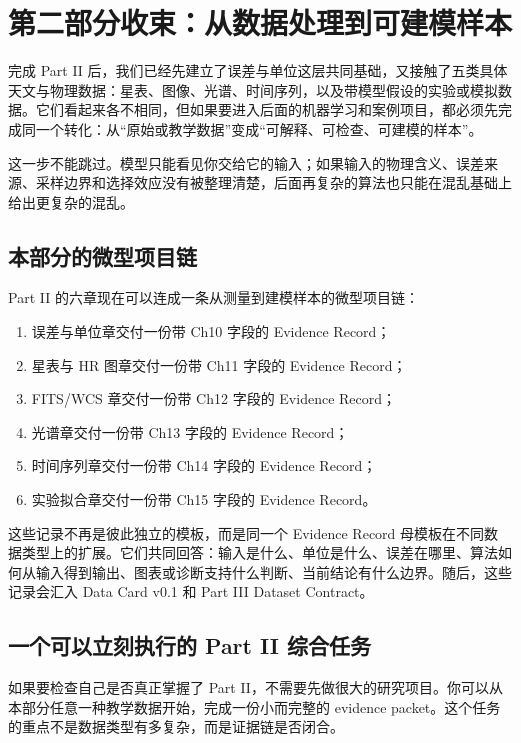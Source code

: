 \chapter*{第二部分收束：从数据处理到可建模样本}

完成 Part II 后，我们已经先建立了误差与单位这层共同基础，又接触了五类具体天文与物理数据：星表、图像、光谱、时间序列，以及带模型假设的实验或模拟数据。它们看起来各不相同，但如果要进入后面的机器学习和案例项目，都必须先完成同一个转化：从“原始或教学数据”变成“可解释、可检查、可建模的样本”。

这一步不能跳过。模型只能看见你交给它的输入；如果输入的物理含义、误差来源、采样边界和选择效应没有被整理清楚，后面再复杂的算法也只能在混乱基础上给出更复杂的混乱。

\section*{本部分的微型项目链}

Part II 的六章现在可以连成一条从测量到建模样本的微型项目链：

\begin{enumerate}
    \item 误差与单位章交付一份带 Ch10 字段的 Evidence Record；
    \item 星表与 HR 图章交付一份带 Ch11 字段的 Evidence Record；
    \item FITS/WCS 章交付一份带 Ch12 字段的 Evidence Record；
    \item 光谱章交付一份带 Ch13 字段的 Evidence Record；
    \item 时间序列章交付一份带 Ch14 字段的 Evidence Record；
    \item 实验拟合章交付一份带 Ch15 字段的 Evidence Record。
\end{enumerate}

这些记录不再是彼此独立的模板，而是同一个 Evidence Record 母模板在不同数据类型上的扩展。它们共同回答：输入是什么、单位是什么、误差在哪里、算法如何从输入得到输出、图表或诊断支持什么判断、当前结论有什么边界。随后，这些记录会汇入 Data Card v0.1 和 Part III Dataset Contract。

\section*{一个可以立刻执行的 Part II 综合任务}

如果要检查自己是否真正掌握了 Part II，不需要先做很大的研究项目。你可以从本部分任意一种教学数据开始，完成一份小而完整的 evidence packet。这个任务的重点不是数据类型有多复杂，而是证据链是否闭合。


